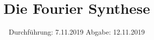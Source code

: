 

\subject{Versuchsnummer: 802}
\title{Die Fourier Synthese}
\date{%
  Durchführung: 7.11.2019
  \hspace{3em}
  Abgabe: 12.11.2019
}



\maketitle
\thispagestyle{empty}
\tableofcontents
\newpage





\newpage
\printbibliography{}


